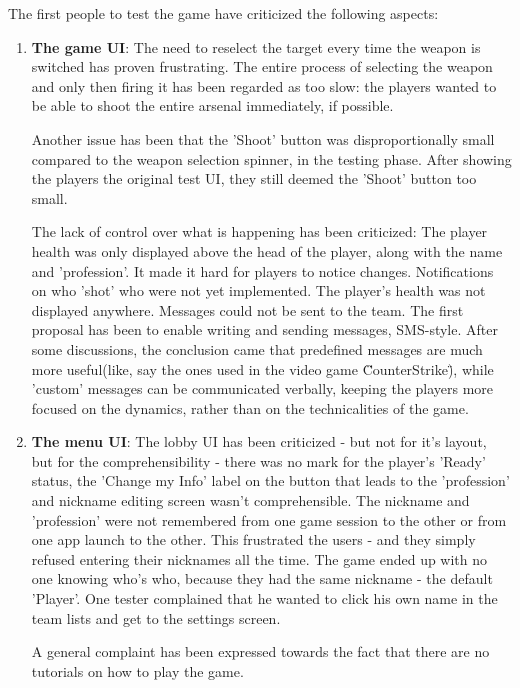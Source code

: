 \documentclass{article}
\begin{document}
The first people to test the game have criticized the following aspects:
\begin{enumerate}
  \item \textbf{The game UI}: The need to reselect the target every time the
  weapon is switched has proven frustrating. The entire process of selecting the
  weapon and only then firing it has been regarded as too slow: the players
  wanted to be able to shoot the entire arsenal immediately, if
  possible.\newline
  
  Another issue has been that the 'Shoot' button was disproportionally small
  compared to the weapon selection spinner, in the testing phase. After showing
  the players the original test UI, they still deemed the 'Shoot' button too
  small.\newline
  
  The lack of control over what is happening has been criticized: The player
  health was only displayed above the head of the player, along with the name
  and 'profession'. It made it hard for players to notice changes. Notifications
  on who 'shot' who were not yet implemented. The player's health was not
  displayed anywhere. Messages could not be sent to the team. The first proposal
  has been to enable writing and sending messages, SMS-style. After some
  discussions, the conclusion came that predefined messages are much more
  useful(like, say the ones used in the video game \"CounterStrike\"), while
  'custom' messages can be communicated verbally, keeping the players more
  focused on the dynamics, rather than on the technicalities of the game.
  
  \item \textbf{The menu UI}: The lobby UI has been criticized - but not for
  it's layout, but for the comprehensibility - there was no mark for the
  player's 'Ready' status, the 'Change my Info' label on the button that leads
  to the 'profession' and nickname editing screen wasn't comprehensible. The
  nickname and 'profession' were not remembered from one game session to the
  other or from one app launch to the other. This frustrated the users - and
  they simply refused entering their nicknames all the time. The game ended up
  with no one knowing who's who, because they had the same nickname - the
  default 'Player'. One tester complained that he wanted to click his own name
  in the team lists and get to the settings screen.\newline
  
  A general complaint has been expressed towards the fact that there are no
  tutorials on how to play the game.
\end{enumerate}
\end{document}
